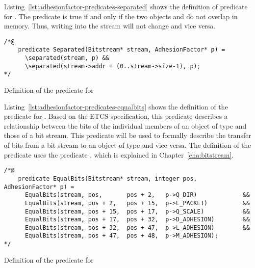 \FloatBarrier

\label{sec:adhesionfactor-predicates-separated}

Listing~\ref{lst:adhesionfactor-predicates-separated} shows the definition of 
predicate   for .
The predicate  is true if and only if 
the two objects  and  do not overlap in memory.
Thus, writing into the stream will not change  and vice versa.

\begin{listing}[hbt]
\begin{minipage}{0.99\textwidth}
\begin{lstlisting}[style=acsl-block]
/*@
    predicate Separated(Bitstream* stream, AdhesionFactor* p) =
      \separated(stream, p) &&
      \separated(stream->addr + (0..stream->size-1), p);
*/
\end{lstlisting}
\end{minipage}
\caption{\label{lst:adhesionfactor-predicates-separated}Definition of the  predicate for }
\end{listing}

\FloatBarrier

\label{sec:adhesionfactor-predicates-equalbits}


Listing~\ref{lst:adhesionfactor-predicates-equalbits} shows the definition of the
 predicate for .
Based on the ETCS specification, this predicate describes a
relationship between the bits of the individual members
of an object of type  and those of a bit stream.
This predicate will be used to formally describe the transfer of bits
from a bit stream to an object of type  and vice versa.
The definition of the predicate  uses
the predicate , which is explained
in Chapter~\ref{cha:bitstream}.

\begin{listing}[hbt]
\begin{minipage}{0.99\textwidth}
\begin{lstlisting}[style=acsl-block]
/*@
    predicate EqualBits(Bitstream* stream, integer pos, AdhesionFactor* p) =
      EqualBits(stream, pos,       pos + 2,   p->Q_DIR)             &&
      EqualBits(stream, pos + 2,   pos + 15,  p->L_PACKET)          &&
      EqualBits(stream, pos + 15,  pos + 17,  p->Q_SCALE)           &&
      EqualBits(stream, pos + 17,  pos + 32,  p->D_ADHESION)        &&
      EqualBits(stream, pos + 32,  pos + 47,  p->L_ADHESION)        &&
      EqualBits(stream, pos + 47,  pos + 48,  p->M_ADHESION);
*/
\end{lstlisting}
\end{minipage}
\caption{\label{lst:adhesionfactor-predicates-equalbits}Definition of the  predicate for }
\end{listing}

